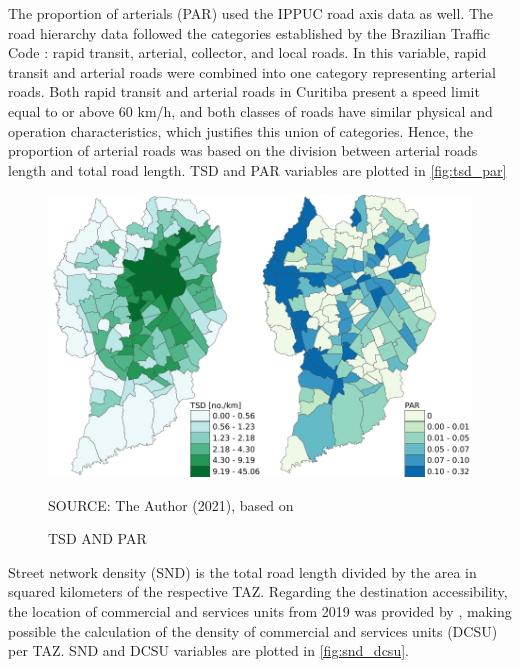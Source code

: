 The proportion of arterials (PAR) used the IPPUC road axis data as well. The road hierarchy data followed the categories established by the Brazilian Traffic Code \cite{Brasil1997}: rapid transit, arterial, collector, and local roads. In this variable, rapid transit and arterial roads were combined into one category representing arterial roads. Both rapid transit and arterial roads in Curitiba present a speed limit equal to or above 60 km/h, and both classes of roads have similar physical and operation characteristics, which justifies this union of categories. Hence, the proportion of arterial roads was based on the division between arterial roads length and total road length. TSD and PAR variables are plotted in \autoref{fig:tsd_par}

\begin{figure}[!htbp]
    \centering\footnotesize
    \captionsetup{font=footnotesize}
    \caption{TSD AND PAR}
    \includegraphics{fig/map_TSD+PAR.pdf}
    \label{fig:tsd_par}
    \par SOURCE: The Author (2021), based on \textcite{IPPUC2018b,IPPUC2021}
\end{figure}

Street network density (SND) is the total road length divided by the area in squared kilometers of the respective TAZ. Regarding the destination accessibility, the location of commercial and services units from 2019 was provided by \textcite{IPPUC2021}, making possible the calculation of the density of commercial and services units (DCSU) per TAZ. SND and DCSU variables are plotted in \autoref{fig:snd_dcsu}.

